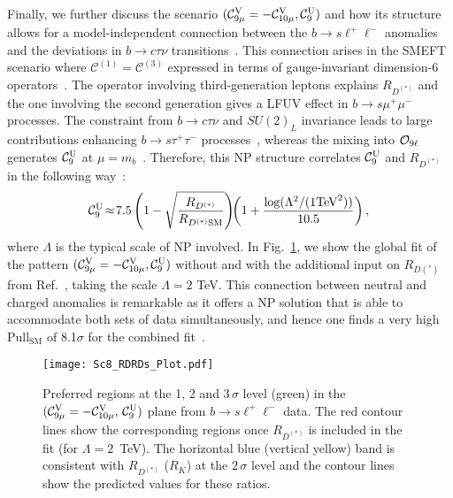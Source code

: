 \documentclass[10pt]{article}
\begin{document}
Finally, we further discuss the scenario $(\mathcal{C}_{9\mu}^{\rm V}=-\mathcal{C}_{10\mu}^{\rm V},\mathcal{C}_{9}^{\rm U})$ and how its structure allows for a model-independent connection between the $b\to s\ell^+\ell^-$ anomalies and the deviations in $b\to c\tau\nu$ transitions~\cite{Amhis:2019ckw}. This connection arises in the SMEFT scenario where $\mathcal{C}^{(1)}=\mathcal{C}^{(3)}$ expressed in terms of gauge-invariant dimension-6 operators~\cite{Grzadkowski:2010es,Capdevila:2017iqn}. The operator involving third-generation leptons explains $R_{D^{(*)}}$ and the one involving the second generation gives a LFUV effect in $b\to s\mu^+\mu^-$ processes. The constraint from $b\to c\tau\nu$ and $SU(2)_L$ invariance leads to large contributions enhancing $b\to s\tau^+\tau^-$ processes~\cite{Capdevila:2017iqn}, whereas the mixing into ${\cal O}_{9\ell}$ generates $\mathcal{C}_{9}^{\rm U}$ at $\mu=m_b$~\cite{Crivellin:2018yvo}.
Therefore, this NP structure correlates $\mathcal{C}_9^{\rm U}$ and $R_{D^{(*)}}$ in the following way~\cite{Capdevila:2017iqn,Crivellin:2018yvo}:
%
\begin{equation}
\mathcal{C}_{9}^{\rm U}\! \approx \! 7.5\left(1-\sqrt{\frac{R_{D^{(*)}}}{R_{D^{(*)}{\rm SM}}}}\right)\!\! \left(1+\frac{\log(\Lambda^2/(1{\rm TeV}^2))}{10.5}\right), \\  \\
\end{equation}
%
where $\Lambda$ is the typical scale of NP involved. In Fig.~\ref{fig:bsllRDRD*}, we show the global fit of the pattern $(\mathcal{C}_{9\mu}^{\rm V}=-\mathcal{C}_{10\mu}^{\rm V},\mathcal{C}_{9}^{\rm U})$ without and with the additional input on $R_{D(^*)}$ from Ref.~\cite{Amhis:2019ckw}, taking the scale $\Lambda=2$ TeV. This connection between neutral and charged anomalies is remarkable as it offers a NP solution that is able to accommodate both sets of data simultaneously, and hence one finds a very high $\text{Pull}_\text{SM}$ of 8.1$\sigma$ for the combined fit~\cite{Alguero:2021anc}.

\begin{figure}
\centering
\texttt{[image: Sc8\_RDRDs\_Plot.pdf]}
\caption{Preferred regions at the 1, 2 and 3$\,\sigma$ level (green) in the $(\mathcal{C}_{9\mu}^{\rm V}=-\mathcal{C}_{10\mu}^{\rm V},\,\mathcal{C}_{9}^{\rm U})$ plane from $b\to s\ell^+\ell^-$ data. The red contour lines show the corresponding regions once $R_{D^{(*)}}$ is included in the fit (for $\Lambda=2$~TeV). The horizontal blue (vertical yellow) band is consistent with $R_{D^{(*)}}$ ($R_{K}$) at the $2\,\sigma$ level and the contour lines show the predicted values for these ratios.}
\label{fig:bsllRDRD*}
\end{figure}
\end{document}
